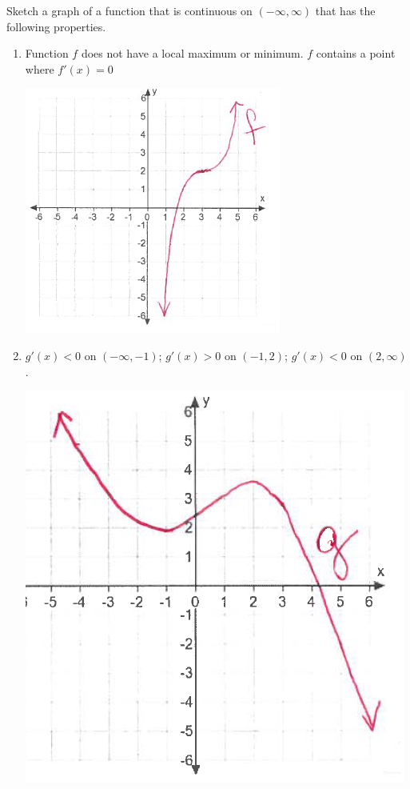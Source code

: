 \documentclass[nooutcomes,handout]{ximera}
\begin{document}
\begin{problem}
Sketch a graph of a function that is continuous on $(-\infty,\infty)$ that has the following properties.
	\begin{enumerate}
	\item Function $f$ does not have a local maximum or minimum.  $f$ contains a point where $f'(x)=0$
	
	
\begin{freeResponse} \hfil
            \begin{image}
              \includegraphics[scale = 0.7]{figure11.png}
            \end{image}	
\end{freeResponse}	
	
	\item $g'(x)<0$ on $(-\infty, -1)$; $g'(x)>0$ on $(-1,2)$; $g'(x)<0$ on $(2,\infty)$.

\begin{freeResponse} \hfil
	            \begin{image}
              \includegraphics[scale = 0.5]{figure6.png}
            \end{image}
\end{freeResponse}		
	

\end{enumerate}
\end{problem}
\end{document}
